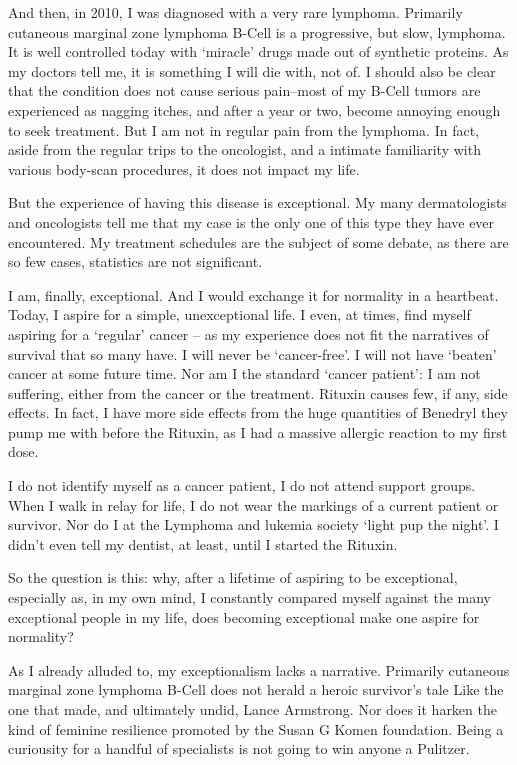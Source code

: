 And then, in 2010, I was diagnosed with a very rare lymphoma. Primarily cutaneous marginal zone lymphoma B-Cell is a progressive, but slow, lymphoma. It is well controlled today with `miracle' drugs made out of synthetic proteins. As my doctors tell me, it is something I will die with, not of. I should also be clear that the condition does not cause serious pain--most of my B-Cell tumors are experienced as nagging itches, and after a year or two, become annoying enough to seek treatment. But I am not in regular pain from the lymphoma. In fact, aside from the regular trips to the oncologist, and a intimate familiarity with various body-scan procedures, it does not impact my life.

But the experience of having this disease is exceptional. My many dermatologists and oncologists tell me that my case is the only one of this type they have ever encountered. My treatment schedules are the subject of some debate, as there are so few cases, statistics are not significant.

I am, finally, exceptional. And I would exchange it for normality in a heartbeat. Today, I aspire for a simple, unexceptional life. I even, at times, find myself aspiring for a `regular' cancer -- as my experience does not fit the narratives of survival that so many have. I will never be `cancer-free'. I will not have `beaten' cancer at some future time. Nor am I the standard `cancer patient': I am not suffering, either from the cancer or the treatment. Rituxin causes few, if any, side effects. In fact, I have more side effects from the huge quantities of Benedryl they pump me with before the Rituxin, as I had a massive allergic reaction to my first dose.

I do not identify myself as a cancer patient, I do not attend support groups. When I walk in relay for life, I do not wear the markings of a current patient or survivor. Nor do I at the Lymphoma and lukemia society `light pup the night'. I didn't even tell my dentist, at least, until I started the Rituxin.

So the question is this: why, after a lifetime of aspiring to be exceptional, especially as, in my own mind, I constantly compared myself against the many exceptional people in my life, does becoming exceptional make one aspire for normality?

As I already alluded to, my exceptionalism lacks a narrative. Primarily cutaneous marginal zone lymphoma B-Cell does not herald a heroic survivor's tale Like the one that made, and ultimately undid, Lance Armstrong. Nor does it harken the kind of feminine resilience promoted by the Susan G Komen foundation. Being a curiousity for a handful of specialists is not going to win anyone a Pulitzer. 

